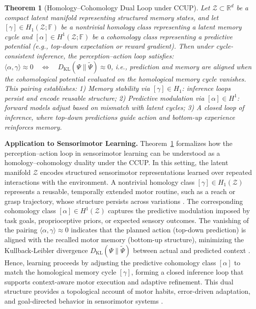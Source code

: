 \documentclass[lettersize,journal]{IEEEtran}
\newtheorem{theorem}{Theorem}
\begin{document}
\begin{theorem}[Homology–Cohomology Dual Loop under CCUP]
Let \( \mathcal{Z} \subset \mathbb{R}^d \) be a compact latent manifold representing structured memory states, and let \( [\gamma] \in H_1(\mathcal{Z}; \mathbb{F}) \) be a nontrivial homology class representing a latent memory cycle and \( [\alpha] \in H^1(\mathcal{Z}; \mathbb{F}) \) be a cohomology class representing a predictive potential (e.g., top-down expectation or reward gradient).
Then under cycle-consistent inference, the perception–action loop satisfies:
$\langle \alpha, \gamma \rangle \approx 0 \quad \Leftrightarrow \quad D_{\mathrm{KL}}(\Psi \| \tilde{\Psi}) \approx 0$,
i.e., prediction and memory are aligned when the cohomological potential evaluated on the homological memory cycle vanishes.
This pairing establishes:
1) Memory stability via \( [\gamma] \in H_1 \): inference loops persist and encode reusable structure;
2) Predictive modulation via \( [\alpha] \in H^1 \): forward models adjust based on mismatch with latent cycles;
3) A closed loop of inference, where top-down predictions guide action and bottom-up experience reinforces memory.
\label{thm:dual_loop}
\end{theorem}

\noindent\textbf{Application to Sensorimotor Learning.}
Theorem~\ref{thm:dual_loop} formalizes how the perception–action loop in sensorimotor learning \cite{fuster2004upper} can be understood as a homology–cohomology duality under the CCUP. In this setting, the latent manifold \( \mathcal{Z} \) encodes structured sensorimotor representations learned over repeated interactions with the environment. A nontrivial homology class \( [\gamma] \in H_1(\mathcal{Z}) \) represents a reusable, temporally extended motor routine, such as a reach or grasp trajectory, whose structure persists across variations \cite{todorov2004optimality}. The corresponding cohomology class \( [\alpha] \in H^1(\mathcal{Z}) \) captures the predictive modulation imposed by task goals, proprioceptive priors, or expected sensory outcomes. The vanishing of the pairing \( \langle \alpha, \gamma \rangle \approx 0 \) indicates that the planned action (top-down prediction) is aligned with the recalled motor memory (bottom-up structure), minimizing the Kullback-Leibler divergence \( D_{\mathrm{KL}}(\Psi \| \tilde{\Psi}) \) between actual and predicted context \cite{cover1999elements}. Hence, learning proceeds by adjusting the predictive cohomology class \( [\alpha] \) to match the homological memory cycle \( [\gamma] \), forming a closed inference loop that supports context-aware motor execution and adaptive refinement. This dual structure provides a topological account of motor habits, error-driven adaptation, and goal-directed behavior in sensorimotor systems \cite{sohn2021network}.
\end{document}
